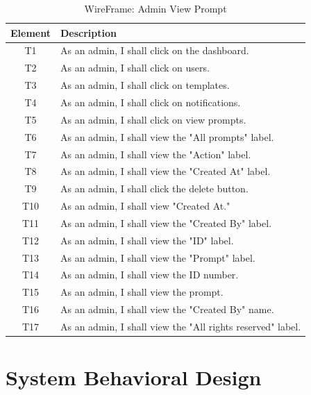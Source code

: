 \documentclass[12pt]{report}
\begin{document}
\begin{table}[h!]
    \centering
    \begin{tabular}{|c|p{10cm}|}
        \hline
        \textbf{Element} & \textbf{Description} \\
        \hline
        T1 & As an admin, I shall click on the dashboard. \\
        \hline
        T2 & As an admin, I shall click on users. \\
        \hline
        T3 & As an admin, I shall click on templates. \\
        \hline
        T4 & As an admin, I shall click on notifications. \\
        \hline
        T5 & As an admin, I shall click on view prompts. \\
        \hline
        T6 & As an admin, I shall view the "All prompts" label. \\
        \hline
        T7 & As an admin, I shall view the "Action" label. \\
        \hline
        T8 & As an admin, I shall view the "Created At" label. \\
        \hline
        T9 & As an admin, I shall click the delete button. \\
        \hline
        T10 & As an admin, I shall view "Created At." \\
        \hline
        T11 & As an admin, I shall view the "Created By" label. \\
        \hline
        T12 & As an admin, I shall view the "ID" label. \\
        \hline
        T13 & As an admin, I shall view the "Prompt" label. \\
        \hline
        T14 & As an admin, I shall view the ID number. \\
        \hline
        T15 & As an admin, I shall view the prompt. \\
        \hline
        T16 & As an admin, I shall view the "Created By" name. \\
        \hline
        T17 & As an admin, I shall view the "All rights reserved" label. \\
        \hline
    \end{tabular}
    \caption{WireFrame: Admin View Prompt}
    \label{tab:admin_prompt_management_actions}
\end{table}


\clearpage
\section{System Behavioral Design}
\end{document}
